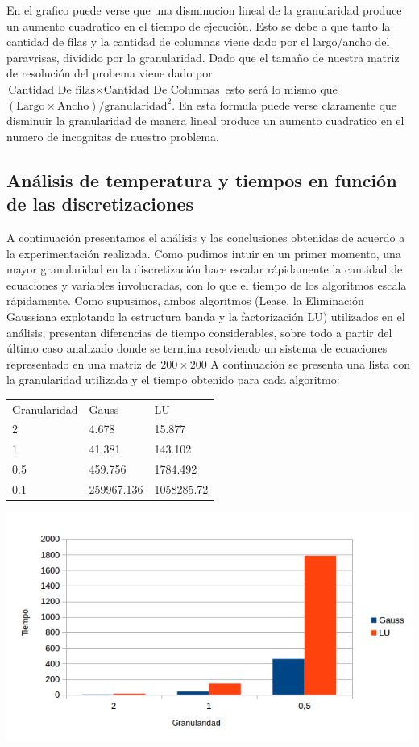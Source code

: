 En el grafico puede verse que una disminucion lineal de la granularidad produce un aumento cuadratico en el tiempo de ejecución. Esto se debe a que tanto la cantidad de filas y la cantidad de columnas viene dado por el largo/ancho del paravrisas, dividido por la granularidad. Dado que el tamaño de nuestra matriz de resolución del probema viene dado por $\text{Cantidad De filas} \times \text{Cantidad De Columnas}$ esto será lo mismo que  $(\text{Largo} \times \text{Ancho}) / \text{granularidad}^2$. En esta formula puede verse claramente que disminuir la granularidad de manera lineal produce un aumento cuadratico en el numero de incognitas de nuestro problema.

\subsection{An\'alisis de temperatura y tiempos en funci\'on de las discretizaciones}
A continuaci\'on presentamos el an\'alisis y las conclusiones obtenidas de acuerdo a la experimentaci\'on realizada.
Como pudimos intuir en un primer momento, una mayor granularidad en la discretizaci\'on hace escalar r\'apidamente la cantidad de ecuaciones y variables involucradas, con lo que el tiempo de los algoritmos escala r\'apidamente. Como supusimos, ambos algoritmos (Lease, la Eliminaci\'on Gaussiana explotando la estructura banda y la factorizaci\'on LU) utilizados en el an\'alisis,  presentan diferencias de tiempo considerables, sobre todo a partir del \'ultimo caso analizado donde se termina resolviendo un sistema de ecuaciones representado en una matriz de $200 \times 200$
A continuaci\'on se presenta una lista con la granularidad utilizada y el tiempo obtenido para cada algoritmo:


\begin{table}[h]
\begin{tabular}{lll}
Granularidad & Gauss & LU \\
2 & 4.678 & 15.877 \\
1 & 41.381 & 143.102 \\
0.5 & 459.756 & 1784.492 \\
0.1 & 259967.136 & 1058285.72 \\
\end{tabular}
\end{table}



\begin{center}
 \includegraphics[width=400pt]{imagenes/grafico.png}
\end{center}



